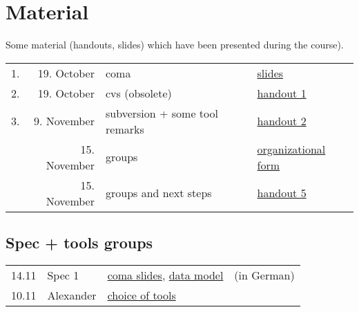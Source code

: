 

\section*{Material}

Some material (handouts, slides) which have been presented during the
course).

\begin{tabular}{r@{\quad\quad}rll}
  \hline
  1. & 19. October & coma  & 
  \href{slides/main-coma.pdf}{slides}
  \\
  2. & 19. October & cvs (obsolete) & \href{handouts/handout1.pdf}{handout 1}
  \\
  3. & 9. November & subversion + some tool remarks &
  \href{handouts/handout2.pdf}{handout 2}
  \\
   & 15. November & groups &
  \href{handouts/handout4.pdf}{organizational form}
  \\
   & 15. November & groups and next steps &
  \href{handouts/handout5.pdf}{handout 5}
  \\
\end{tabular}




\subsection{Spec + tools groups}
\label{sec:material.spec-tools}


\begin{tabular}{llll}
  14.11 & Spec 1 & \href{spec/material/spec1/slides.pdf}{coma slides}, 
  \href{spec/material/spec1/datenmodell.pdf}{data model}
  & (in German)
  \\
  10.11 & Alexander & \href{spec/material/derenbach/tools.pdf}{choice of tools}
\end{tabular}

